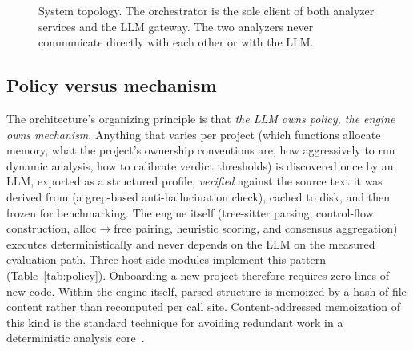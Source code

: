 \documentclass[11pt,a4paper]{article}
\begin{document}
\begin{figure}[htbp]
\centering
{}
\caption{System topology. The orchestrator is the sole client of both
analyzer services and the LLM gateway. The two analyzers never communicate
directly with each other or with the LLM.}
\label{fig:topology}
\end{figure}

\subsection{Policy versus mechanism}
\label{sec:policy-mechanism}

The architecture's organizing principle is that \emph{the LLM owns
policy, the engine owns mechanism}. Anything that varies per project
(which functions allocate memory, what the project's ownership conventions
are, how aggressively to run dynamic analysis, how to calibrate verdict
thresholds) is discovered once by an LLM, exported as a structured
profile, \emph{verified} against the source text it was derived from (a
grep-based anti-hallucination check), cached to disk, and then frozen for
benchmarking. The engine itself (tree-sitter parsing, control-flow
construction, alloc$\to$free pairing, heuristic scoring, and consensus
aggregation) executes deterministically and never depends on the LLM on
the measured evaluation path. Three host-side modules implement this
pattern (Table~\ref{tab:policy}). Onboarding a new project therefore
requires zero lines of new code. Within the engine itself, parsed
structure is memoized by a hash of file content rather than recomputed
per call site. Content-addressed memoization of this kind is the
standard technique for avoiding redundant work in a deterministic
analysis core~\cite{infer-verification}.
\end{document}
